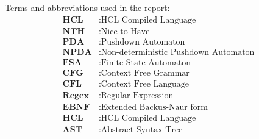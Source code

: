 
Terms and abbreviations used in the report:
\begin{align*}
	\textbf{HCL} &: \text{HCL Compiled Language} \\
    \textbf{NTH} &: \text{Nice to Have} \\
    \textbf{PDA} &: \text{Pushdown Automaton} \\
    \textbf{NPDA} &: \text{Non-deterministic Pushdown Automaton} \\
    \textbf{FSA} &: \text{Finite State Automaton} \\
    \textbf{CFG} &: \text{Context Free Grammar} \\
    \textbf{CFL} &: \text{Context Free Language} \\
    \textbf{Regex} &: \text{Regular Expression} \\
    \textbf{EBNF} &: \text{Extended Backus-Naur form} \\
    \textbf{HCL} &: \text{HCL Compiled Language} \\
    \textbf{AST} &: \text{Abstract Syntax Tree} \\
\end{align*}